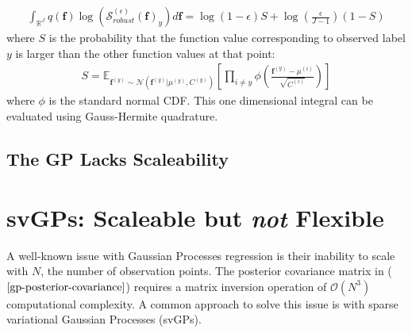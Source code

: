 \documentclass{article}
\numberwithin{equation}{section}
\begin{document}
\begin{align}
\int_{\mathbb{R}^J} q(\mathbf{f}) \log(\mathcal{S}_{robust}^{(\epsilon)}(\mathbf{f})_y) d\textbf{f} = \log(1-\epsilon) S + \log\left(\frac{\epsilon}{J-1}\right)(1-S)
\end{align}
where $S$ is the probability that the function value corresponding to observed label $y$ is larger than the other function values at that point:
\begin{align}
S = \mathbb{E}_{\mathbf{f}^{(y)} \sim \mathcal{N}(\mathbf{f}^{(y)} | \mu^{(y)}, C^{(y)})} \left[\prod_{i \neq y} \phi \left(\frac{\textbf{f}^{(y)}-\mu^{(i)}}{\sqrt{C^{(i)}}} \right)\right]
\end{align}
where $\phi$ is the standard normal CDF. This one dimensional integral can be evaluated using Gauss-Hermite quadrature.

\subsection{The GP Lacks Scaleability}


\newpage
\section{svGPs: Scaleable but \textit{not} Flexible}
A well-known issue with Gaussian Processes regression is their inability to scale with $N$, the number of observation points. The posterior covariance matrix in ($\ref{gp-posterior-covariance}$) requires a matrix inversion operation of $\mathcal{O}(N^3)$ computational complexity. A common approach to solve this issue is with sparse variational Gaussian Processes (svGPs).
\end{document}

